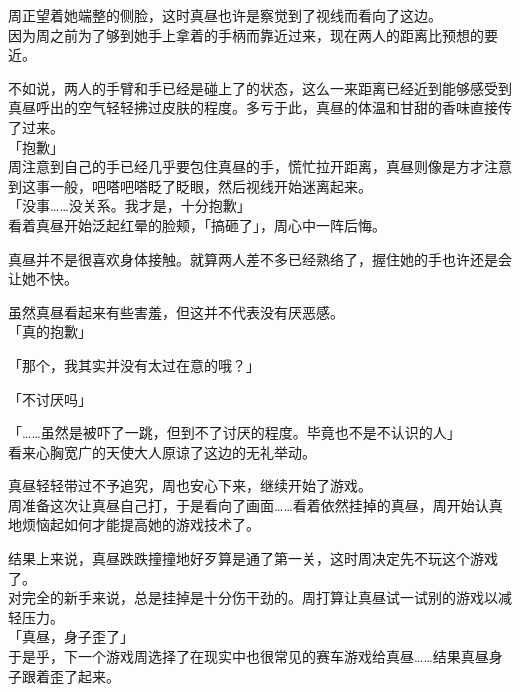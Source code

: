 周正望着她端整的侧脸，这时真昼也许是察觉到了视线而看向了这边。\\

因为周之前为了够到她手上拿着的手柄而靠近过来，现在两人的距离比预想的要近。

不如说，两人的手臂和手已经是碰上了的状态，这么一来距离已经近到能够感受到真昼呼出的空气轻轻拂过皮肤的程度。多亏于此，真昼的体温和甘甜的香味直接传了过来。\\

「抱歉」\\

周注意到自己的手已经几乎要包住真昼的手，慌忙拉开距离，真昼则像是方才注意到这事一般，吧嗒吧嗒眨了眨眼，然后视线开始迷离起来。\\

「没事……没关系。我才是，十分抱歉」\\

看着真昼开始泛起红晕的脸颊，「搞砸了」，周心中一阵后悔。

真昼并不是很喜欢身体接触。就算两人差不多已经熟络了，握住她的手也许还是会让她不快。

虽然真昼看起来有些害羞，但这并不代表没有厌恶感。\\

「真的抱歉」

「那个，我其实并没有太过在意的哦？」

「不讨厌吗」

「……虽然是被吓了一跳，但到不了讨厌的程度。毕竟也不是不认识的人」\\

看来心胸宽广的天使大人原谅了这边的无礼举动。

真昼轻轻带过不予追究，周也安心下来，继续开始了游戏。\\

周准备这次让真昼自己打，于是看向了画面……看着依然挂掉的真昼，周开始认真地烦恼起如何才能提高她的游戏技术了。\\

\vspace{2\baselineskip}

结果上来说，真昼跌跌撞撞地好歹算是通了第一关，这时周决定先不玩这个游戏了。\\

对完全的新手来说，总是挂掉是十分伤干劲的。周打算让真昼试一试别的游戏以减轻压力。\\

「真昼，身子歪了」\\

于是乎，下一个游戏周选择了在现实中也很常见的赛车游戏给真昼……结果真昼身子跟着歪了起来。


